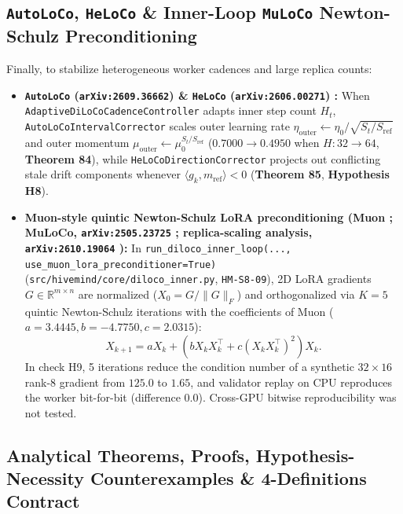 \documentclass[11pt,a4paper]{article}
\begin{document}
\subsection{\texttt{AutoLoCo}, \texttt{HeLoCo} \& Inner-Loop \texttt{MuLoCo} Newton-Schulz Preconditioning}

Finally, to stabilize heterogeneous worker cadences and large replica counts:
\begin{itemize}[leftmargin=1.8em]
    \item \textbf{\texttt{AutoLoCo} (\texttt{arXiv:2609.36662}) \cite{he2026autoloco} \& \texttt{HeLoCo} (\texttt{arXiv:2606.00271}) \cite{asif2026heloco}:} When \texttt{AdaptiveDiLoCoCadenceController} adapts inner step count $H_t$, \texttt{AutoLoCoIntervalCorrector} scales outer learning rate $\eta_{\text{outer}} \leftarrow \eta_0 / \sqrt{S_t / S_{\text{ref}}}$ and outer momentum $\mu_{\text{outer}} \leftarrow \mu_0^{S_t / S_{\text{ref}}}$ ($0.7000 \to 0.4950$ when $H: 32 \to 64$, \textbf{Theorem 84}), while \texttt{HeLoCoDirectionCorrector} projects out conflicting stale drift components whenever $\langle g_k, m_{\text{ref}} \rangle < 0$ (\textbf{Theorem 85}, \textbf{Hypothesis H8}).
    \item \textbf{Muon-style quintic Newton-Schulz LoRA preconditioning (Muon \cite{jordan2024muon}; MuLoCo, \texttt{arXiv:2505.23725} \cite{therien2025muloco}; replica-scaling analysis, \texttt{arXiv:2610.19064} \cite{belilovsky2026inner}):} In \texttt{run\_diloco\_inner\_loop(..., use\_muon\_lora\_preconditioner=True)} (\texttt{src/hivemind/core/diloco\_inner.py}, \texttt{HM-S8-09}), 2D LoRA gradients $G \in \mathbb{R}^{m \times n}$ are normalized ($X_0 = G / \|G\|_F$) and orthogonalized via $K=5$ quintic Newton-Schulz iterations with the coefficients of Muon \cite{jordan2024muon} ($a=3.4445, b=-4.7750, c=2.0315$):
    \begin{equation}
        X_{k+1} = a X_k + \left(b X_k X_k^\top + c \left(X_k X_k^\top\right)^2\right) X_k.
    \end{equation}
    In check H9, 5 iterations reduce the condition number of a synthetic $32 \times 16$ rank-8 gradient from $125.0$ to $1.65$, and validator replay on CPU reproduces the worker bit-for-bit (difference $0.0$). Cross-GPU bitwise reproducibility was not tested.
\end{itemize}

\subsection{Analytical Theorems, Proofs, Hypothesis-Necessity Counterexamples \& 4-Definitions Contract}
\label{sec:analytical_proofs}
\end{document}
